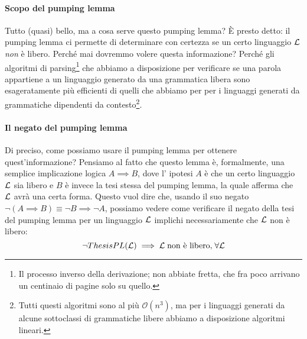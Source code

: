 \documentclass[class=book, crop=false, oneside, 12pt]{standalone}
\begin{document}
  \paragraph{Scopo del pumping lemma}
  Tutto (quasi) bello, ma a cosa serve questo pumping lemma? È presto detto: il pumping lemma ci permette di determinare con certezza se un certo linguaggio \(\mathcal{L}\) \emph{non} è libero. Perché mai dovremmo volere questa informazione? Perché gli algoritmi di parsing\footnote{Il processo inverso della derivazione; non abbiate fretta, che fra poco arrivano un centinaio di pagine solo su quello.} che abbiamo a disposizione per verificare se una parola appartiene a un linguaggio generato da una grammatica libera sono esageratamente più efficienti di quelli che abbiamo per per i linguaggi generati da grammatiche dipendenti da contesto\footnote{Tutti questi algoritmi sono al più \(\mathcal{O}(n^3)\), ma per i linguaggi generati da alcune sottoclassi di grammatiche libere abbiamo a disposizione algoritmi lineari.}.

  \paragraph{Il negato del pumping lemma}
  Di preciso, come possiamo usare il pumping lemma per ottenere quest'informazione? Pensiamo al fatto che questo lemma è, formalmente, una semplice implicazione logica \(A \implies B\), dove l' ipotesi \(A\) è che un certo linguaggio \(\mathcal{L}\) sia libero e \(B\) è invece la tesi stessa del pumping lemma, la quale afferma che \(\mathcal{L}\) avrà una certa forma. Questo vuol dire che, usando il suo negato \(\neg (A \implies B) \equiv \neg B \implies \neg A\), possiamo vedere come verificare il negato della tesi del pumping lemma per un linguaggio \(\mathcal{L}\) implichi necessariamente che \(\mathcal{L}\) non è libero:
  \begin{equation}
    \label{eq:pl-neg-abstract}
    \neg ThesisPL(\mathcal{L}) \implies \mathcal{L}\; \textrm{non è libero,}\; \forall \mathcal{L}
  \end{equation}
\end{document}
